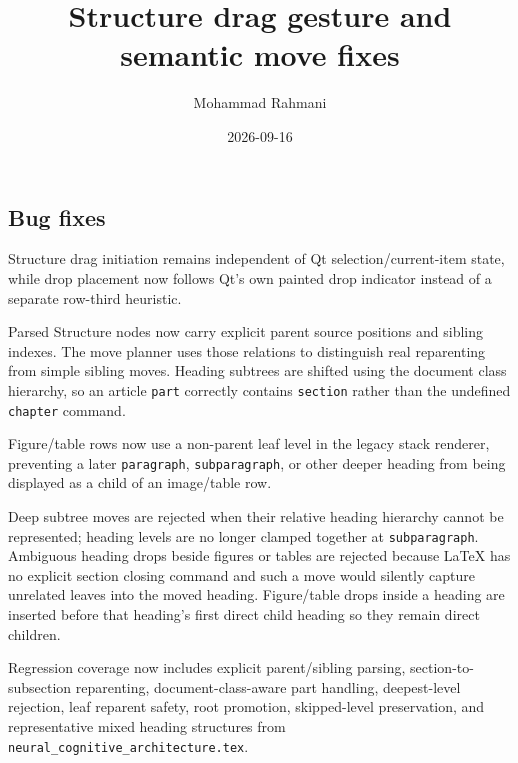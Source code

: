 \documentclass[a4paper]{article}
\title{Structure drag gesture and semantic move fixes}
\date{2026-09-16}
\author{Mohammad Rahmani}
\begin{document}
   \maketitle

   \begin{preview}
      \section{Bug fixes}
      Structure drag initiation remains independent of Qt selection/current-item state, while drop placement now follows Qt's own painted drop indicator instead of a separate row-third heuristic.

      Parsed Structure nodes now carry explicit parent source positions and sibling indexes. The move planner uses those relations to distinguish real reparenting from simple sibling moves. Heading subtrees are shifted using the document class hierarchy, so an article \texttt{part} correctly contains \texttt{section} rather than the undefined \texttt{chapter} command.

      Figure/table rows now use a non-parent leaf level in the legacy stack renderer, preventing a later \texttt{paragraph}, \texttt{subparagraph}, or other deeper heading from being displayed as a child of an image/table row.

      Deep subtree moves are rejected when their relative heading hierarchy cannot be represented; heading levels are no longer clamped together at \texttt{subparagraph}. Ambiguous heading drops beside figures or tables are rejected because LaTeX has no explicit section closing command and such a move would silently capture unrelated leaves into the moved heading. Figure/table drops inside a heading are inserted before that heading's first direct child heading so they remain direct children.

      Regression coverage now includes explicit parent/sibling parsing, section-to-subsection reparenting, document-class-aware part handling, deepest-level rejection, leaf reparent safety, root promotion, skipped-level preservation, and representative mixed heading structures from \texttt{neural\_cognitive\_architecture.tex}.
   \end{preview}

   
   
\end{document}
